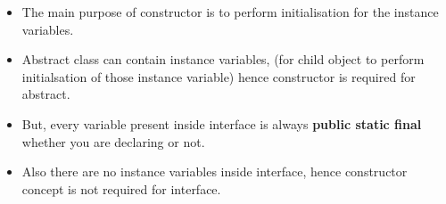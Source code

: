 \begin{flushleft}
	{
	\begin{itemize}
		\item The main purpose of constructor is to perform initialisation for the instance variables.
		\item Abstract class can contain instance variables, (for child object to perform initialsation of those instance variable) hence constructor is required for abstract.
		\item But, every variable present inside interface is always \textbf{public static final} whether you are declaring or not.
		\item Also there are no instance variables inside interface, hence constructor concept is not required for interface.		
	\end{itemize}
	}
	\bigskip

\end{flushleft}
\newpage

